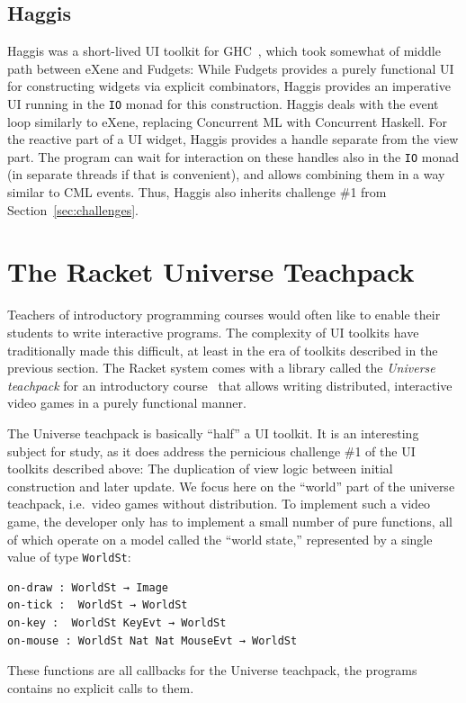 \documentclass[sigplan,screen]{acmart}
\begin{document}
\subsection{Haggis}

Haggis was a short-lived UI toolkit for GHC~\cite{Haggis}, which took
somewhat of middle path between eXene and Fudgets: While Fudgets
provides a purely functional UI for constructing widgets via explicit
combinators, Haggis provides an imperative UI running in the
\texttt{IO} monad for this construction.  Haggis deals with the event
loop similarly to eXene, replacing Concurrent ML with Concurrent
Haskell.  For the reactive part of a UI widget, Haggis provides a
handle separate from the view part.  The program can wait for
interaction on these handles also in the \texttt{IO} monad (in
separate threads if that is convenient), and allows combining them in
a way similar to CML events.  Thus, Haggis also inherits challenge
\#1 from Section~\ref{sec:challenges}.

\section{The Racket Universe Teachpack}
\label{sec:universe-teachpack}

Teachers of introductory programming courses would often like to
enable their students to write interactive programs.  The complexity
of UI toolkits have traditionally made this difficult, at least in the
era of toolkits described in the previous section.  The Racket system
comes with a library called the \textit{Universe teachpack} for an
introductory course~\cite{UniverseTeachpack} that allows writing
distributed, interactive video games in a purely functional manner.

The Universe teachpack is basically ``half'' a UI toolkit.  It is an
interesting subject for study, as it does address the pernicious
challenge \#1 of the UI toolkits described above: The duplication of
view logic between initial construction and later update.  We focus
here on the ``world'' part of the universe teachpack, i.e.\ video
games without distribution.  To implement such a video game, the
developer only has to implement a small number of pure functions, all
of which operate on a model called the ``world state,'' represented by
a single value of type \texttt{WorldSt}:
%
\begin{verbatim}
on-draw : WorldSt → Image
on-tick :  WorldSt → WorldSt
on-key :  WorldSt KeyEvt → WorldSt
on-mouse : WorldSt Nat Nat MouseEvt → WorldSt
\end{verbatim}
%
These functions are all callbacks for the Universe teachpack, the
programs contains no explicit calls to them.
\end{document}
